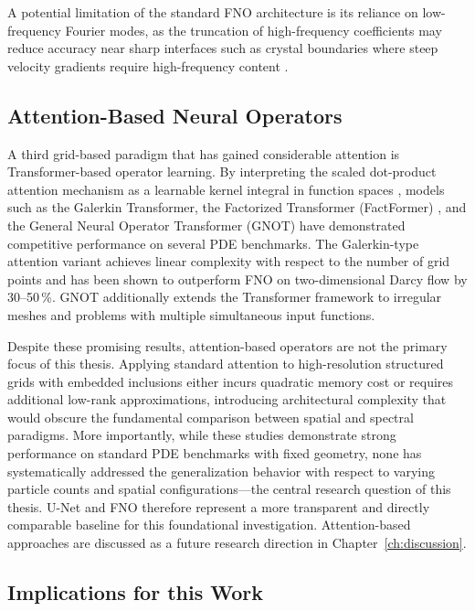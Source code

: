 A potential limitation of the standard FNO architecture is its reliance on low-frequency Fourier modes, as the truncation of high-frequency coefficients may reduce accuracy near sharp interfaces such as crystal boundaries where steep velocity gradients require high-frequency content \parencite{qin_toward_2024}.

\subsection{Attention-Based Neural Operators}

A third grid-based paradigm that has gained considerable attention is Transformer-based operator learning. By interpreting the scaled dot-product attention mechanism as a learnable kernel integral in function spaces \parencite{cao2021choosetransformerfouriergalerkin}, models such as the Galerkin Transformer, the Factorized Transformer (FactFormer) \parencite{li2023scalabletransformerpdesurrogate}, and the General Neural Operator Transformer (GNOT) \parencite{hao2023gnotgeneralneuraloperator} have demonstrated competitive performance on several PDE benchmarks. The Galerkin-type attention variant achieves linear complexity with respect to the number of grid points and has been shown to outperform FNO on two-dimensional Darcy flow by 30--50\,\%. GNOT additionally extends the Transformer framework to irregular meshes and problems with multiple simultaneous input functions.

Despite these promising results, attention-based operators are not the primary focus of this thesis. Applying standard attention to high-resolution structured grids with embedded inclusions either incurs quadratic memory cost or requires additional low-rank approximations, introducing architectural complexity that would obscure the fundamental comparison between spatial and spectral paradigms. More importantly, while these studies demonstrate strong performance on standard PDE benchmarks with fixed geometry, none has systematically addressed the generalization behavior with respect to varying particle counts and spatial configurations—the central research question of this thesis. U-Net and FNO therefore represent a more transparent and directly comparable baseline for this foundational investigation. Attention-based approaches are discussed as a future research direction in Chapter~\ref{ch:discussion}.

\subsection{Implications for this Work}

